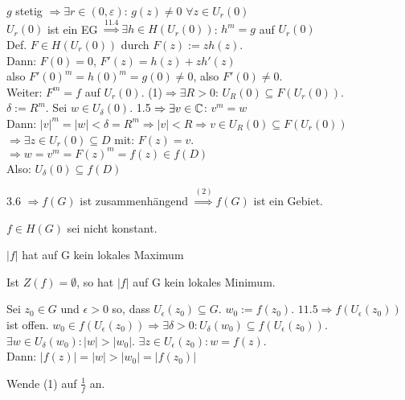 \documentclass[a4paper,twoside,DIV15,BCOR12mm]{scrbook}
\begin{document}
\begin{beweis}
\begin{liste}
$g$ stetig $\Rightarrow \exists r \in (0,\varepsilon)$: $g(z) \neq 0$ $\forall z \in U_r(0)$\\
$U_r(0)$ ist ein EG $\stackrel{11.4}{\Rightarrow} \exists h \in H(U_r(0))$: $h^m = g$ auf $U_r(0)$\\
Def. $F \in H(U_r(0))$ durch $F(z) := z h(z)$. \\
Dann: $F(0)=0$, $F'(z) = h(z) + zh'(z)$\\
also $F'(0)^m = h(0)^m = g(0) \neq 0$, also $F'(0) \neq 0$.\\
Weiter: $F^m = f$ auf $U_r(0)$. (1)$\Rightarrow \exists R > 0$: $U_R(0) \subseteq F(U_r(0))$.\\
$\delta := R^m$. Sei $w \in U_{\delta}(0)$. 1.5 $\Rightarrow \exists v \in \mathbb{C}$: $v^m = w$\\
Dann: $|v|^m = |w| < \delta = R^m \Rightarrow |v| < R \Rightarrow v \in U_R(0) \subseteq F(U_r(0))$\\
$\Rightarrow \exists z \in U_r(0) \subseteq D$ mit: $F(z) = v$.\\
$\Rightarrow w = v^m = F(z)^m = f(z) \in f(D)$\\
Also: $U_{\delta}(0) \subseteq f(D)$
\item 3.6 $\Rightarrow f(G)$ ist zusammenhängend $\stackrel{(2)}{\Rightarrow} f(G)$ ist ein Gebiet.

\end{liste}
\end{beweis}

\begin{satz} 
$f \in H(G)$ sei nicht konstant.
\begin{liste}
\item $|f|$ hat auf G kein lokales Maximum
\item Ist $Z(f) = \emptyset$, so hat $|f|$ auf G kein lokales Minimum.
\end{liste}
\end{satz}

\begin{beweis}
\begin{liste}
\item Sei $z_0 \in G$ und $\epsilon > 0$ so, dass $U_{\epsilon}(z_0) \subseteq
G.$ $ w_0 := f(z_0). $ $11.5 \Rightarrow f(U_{\epsilon}(z_0))$ ist offen. $w_0
\in f(U_{\epsilon}(z_0)) \Rightarrow \exists \delta > 0: U_{\delta}(w_0)
\subseteq f(U_{\epsilon}(z_0)).$ \\ $\exists w \in U_{\delta}(w_0) : |w| >
|w_0|.$ $
\exists z \in U_{\epsilon}(z_0): w = f(z)$.\\ Dann: $|f(z)| = |w| > |w_0| = |f(z_0)|$
\item Wende (1) auf $\frac{1}{f}$ an.
\end{liste} 
\end{beweis}
\end{document}
